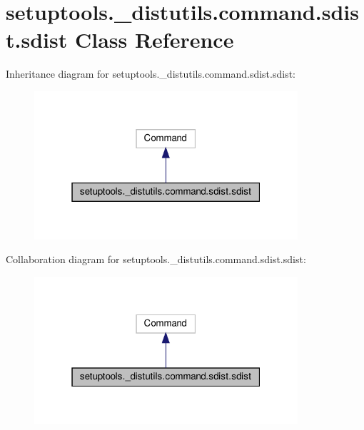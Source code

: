 \hypertarget{classsetuptools_1_1__distutils_1_1command_1_1sdist_1_1sdist}{}\section{setuptools.\+\_\+distutils.\+command.\+sdist.\+sdist Class Reference}
\label{classsetuptools_1_1__distutils_1_1command_1_1sdist_1_1sdist}


Inheritance diagram for setuptools.\+\_\+distutils.\+command.\+sdist.\+sdist\+:
\nopagebreak
\begin{figure}[H]
\begin{center}
\leavevmode
\includegraphics[width=277pt]{classsetuptools_1_1__distutils_1_1command_1_1sdist_1_1sdist__inherit__graph}
\end{center}
\end{figure}


Collaboration diagram for setuptools.\+\_\+distutils.\+command.\+sdist.\+sdist\+:
\nopagebreak
\begin{figure}[H]
\begin{center}
\leavevmode
\includegraphics[width=277pt]{classsetuptools_1_1__distutils_1_1command_1_1sdist_1_1sdist__coll__graph}
\end{center}
\end{figure}
